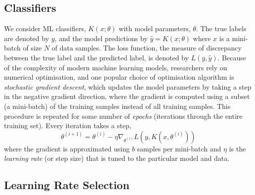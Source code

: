 \documentclass[conference]{IEEEtran}
\begin{document}
\subsection{Classifiers}

We consider ML classifiers, $K(x; \theta)$ with model parameters, $\theta$. The true labels are denoted by $y$, and the model predictions by $\hat{y} = K(x; \theta)$ where $x$ is a mini-batch of size $N$ of data samples. The loss function, the measure of discrepancy between the true label and the predicted label, is denoted by $L(y, \hat{y})$.
Because of the complexity of modern machine learning models, researchers rely on numerical optimisation, and one popular choice of optimisation algorithm is \textit{stochastic gradient descent}, which updates the model parameters by taking a step in the negative gradient direction, where the gradient is computed using a subset (a mini-batch) of the training samples instead of all training samples.
This procedure is repeated for some number of \textit{epochs} (iterations through the entire training set). Every iteration takes a step,
\begin{equation}
    \theta^{(i+1)} = \theta^{(i)} - \eta \nabla_{\theta^{(i)}} L(y, K(x, \theta^{(i)}))
    \label{eq:sgd}
\end{equation}
where the gradient is approximated using $b$ samples per mini-batch and $\eta$ is the \textit{learning rate} (or step size) that is tuned to the particular model and data.


\subsection{Learning Rate Selection}
\label{learning_rate}
\end{document}
